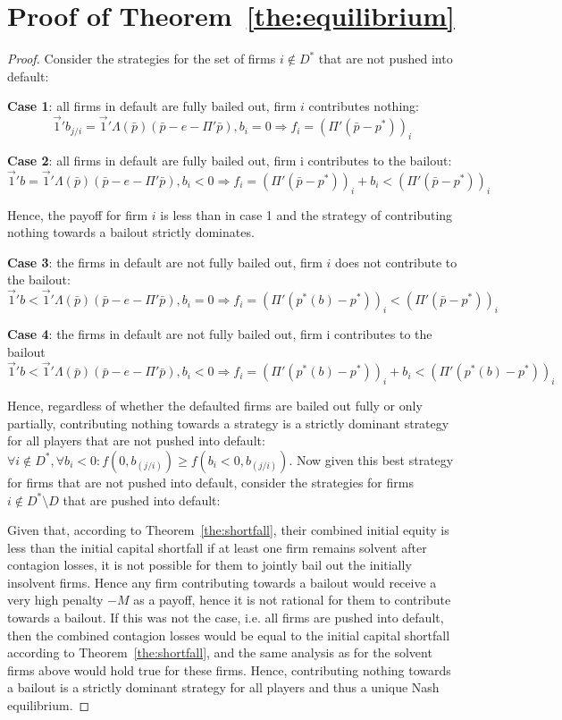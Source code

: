 \documentclass[12pt,a4paper]{article}
\begin{document}
\section{Proof of Theorem~\ref{the:equilibrium}}
\begin{proof}

Consider the strategies for the set of firms $i\notin D^*$ that are not pushed into default:

\textbf{Case 1}: all firms in default are fully bailed out, firm $i$ contributes nothing:
\[
\vec{1}' b_{j/i}= \vec{1}' \Lambda(\bar{p})(\bar{p}-e-\Pi' \bar{p}),b_i=0 \Rightarrow f_i=(\Pi' (\bar{p}-p^* ))_i
\]

\textbf{Case 2}: all firms in default are fully bailed out, firm i contributes to the bailout:
\[
\vec{1}'b=\vec{1}' \Lambda(\bar{p})(\bar{p}-e-\Pi' \bar{p}),b_i<0 \Rightarrow f_i=(\Pi' (\bar{p}-p^* ))_i+b_i<(\Pi' (\bar{p}-p^* ))_i
\]

Hence, the payoff for firm $i$ is less than in case 1 and the strategy of contributing nothing towards a bailout strictly dominates.

\textbf{Case 3}: the firms in default are not fully bailed out, firm $i$ does not contribute to the bailout:
\[
\vec{1}' b<\vec{1}' \Lambda(\bar{p})(\bar{p}-e-\Pi' \bar{p}),b_i=0 \Rightarrow f_i=(\Pi' (p^* (b)-p^* ))_i<(\Pi' (\bar{p}-p^* ))_i
\]

\textbf{Case 4}: the firms in default are not fully bailed out, firm i contributes to the bailout
\[
\vec{1}' b<\vec{1}' \Lambda(\bar{p})(\bar{p}-e-\Pi' \bar{p}),b_i<0 \Rightarrow f_i=(\Pi' (p^* (b)-p^* ))_i+b_i<(\Pi' (p^* (b)-p^* ))_i
\]

Hence, regardless of whether the defaulted firms are bailed out fully or only partially, contributing nothing towards a strategy is a strictly dominant strategy for all players that are not pushed into default: $\forall i \notin D^*,\forall b_i<0 \colon f(0,b_(j/i) ) \ge f(b_i<0,b_(j/i) )$. Now given this best strategy for firms that are not pushed into default, consider the strategies for firms $i \notin D^* \setminus D$ that are pushed into default:

Given that, according to Theorem~\ref{the:shortfall}, their combined initial equity is less than the initial capital shortfall if at least one firm remains solvent after contagion losses, it is not possible for them to jointly bail out the initially insolvent firms. Hence any firm contributing towards a bailout would receive a very high penalty $-M$ as a payoff, hence it is not rational for them to contribute towards a bailout. If this was not the case, i.e. all firms are pushed into default, then the combined contagion losses would be equal to the initial capital shortfall according to Theorem~\ref{the:shortfall}, and the same analysis as for the solvent firms above would hold true for these firms. Hence, contributing nothing towards a bailout is a strictly dominant strategy for all players and thus a unique Nash equilibrium.


\end{proof}
\end{document}
